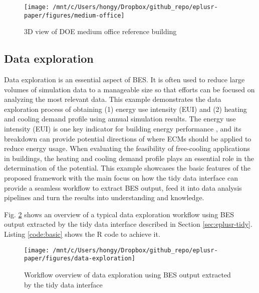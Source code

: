 \documentclass[3p, times]{elsarticle} %
\begin{document}
\begin{figure}[!htb]
\texttt{[image: /mnt/c/Users/hongy/Dropbox/github\_repo/eplusr-paper/figures/medium-office]} \caption{3D view of DOE medium office reference building}\label{fig:medium-office}
\end{figure}

\hypertarget{sec:basic}{%
\subsection{Data exploration}\label{sec:basic}}

Data exploration is an essential aspect of BES. It is often used to reduce
large volumes of simulation data to a manageable size so that efforts can be
focused on analyzing the most relevant data.
This example demonstrates the data exploration process of obtaining (1) energy
use intensity (EUI) and (2) heating and cooling demand profile using annual
simulation results.
The energy use intensity (EUI) is one key indicator for building energy
performance \citep{Yoon2017Objective}, and its breakdown can provide potential directions of where ECMs
should be applied to reduce energy usage. When evaluating the feasibility of
free-cooling applications in buildings, the heating and cooling demand profile
plays an essential role in the determination of the potential.
This example showcases the basic features of the proposed framework with the
main focus on how the tidy data interface can provide a seamless workflow to
extract BES output, feed it into data analysis pipelines and turn the results
into understanding and knowledge.

Fig. \ref{fig:flow-data} shows an overview of a typical data exploration
workflow using BES output extracted by the tidy data interface described in
Section \ref{sec:eplusr-tidy}.
Listing \ref{code:basic} shows the R code to achieve it.

\begin{figure}[!htb]
\texttt{[image: /mnt/c/Users/hongy/Dropbox/github\_repo/eplusr-paper/figures/data-exploration]} \caption{Workflow overview of data exploration using BES output extracted by the tidy data interface}\label{fig:flow-data}
\end{figure}
\end{document}
